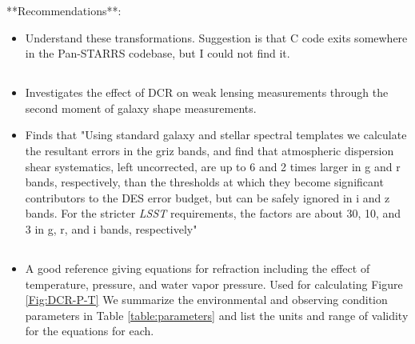 \documentclass[DM,authoryear,toc]{lsstdoc}
\begin{document}
**Recommendations**:
\begin{itemize}
	\item Understand these transformations. Suggestion is that C
          code exits somewhere in the Pan-STARRS codebase, but I could
          not find it.
\end{itemize}

\subsection{\cite{AlejandroPlazas2012}}
\begin{itemize}
	\item Investigates the effect of DCR on weak lensing measurements through the second moment of galaxy shape measurements.
	\item Finds that "Using standard galaxy and stellar spectral templates we calculate the resultant errors in the griz bands, and find that atmospheric dispersion shear systematics, left uncorrected, are up to 6 and 2 times larger in g and r bands, respectively, than the thresholds at which they become significant contributors to the DES error budget, but can be safely ignored in i and z bands. For the stricter \textit{LSST} requirements, the factors are about 30, 10, and 3 in g, r, and i bands, respectively"
\end{itemize}

\subsection{\cite{Stone1996}}
\begin{itemize}
	\item A good reference giving equations for refraction
          including the effect of temperature, pressure, and water
          vapor pressure. Used for calculating Figure
          \ref{Fig:DCR-P-T}
          We summarize the environmental and observing condition parameters in Table \ref{table:parameters} and list the units and range of validity for the equations for each.

\end{itemize}
\end{document}
